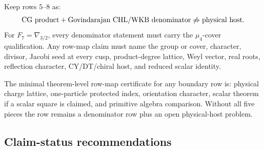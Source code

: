 Keep rows \(5\)--\(8\) as:
\[
\hbox{CG product}+\hbox{Govindarajan CHL/WKB denominator}
\not\Rightarrow
\hbox{physical host}.
\]
For \(F_7=\nabla_{3/2}\), every denominator statement must carry the
\(\mu_4\)-cover qualification.  Any row-map claim must name the group or
cover, character, divisor, Jacobi seed at every cusp, product-degree
lattice, Weyl vector, real roots, reflection character, CY/DT/chiral
host, and reduced scalar identity.

The minimal theorem-level row-map certificate for any boundary row is:
physical charge lattice, one-particle protected index, orientation
character, scalar theorem if a scalar square is claimed, and primitive
algebra comparison.  Without all five pieces the row remains a
denominator row plus an open physical-host problem.

\subsection{Claim-status recommendations}

